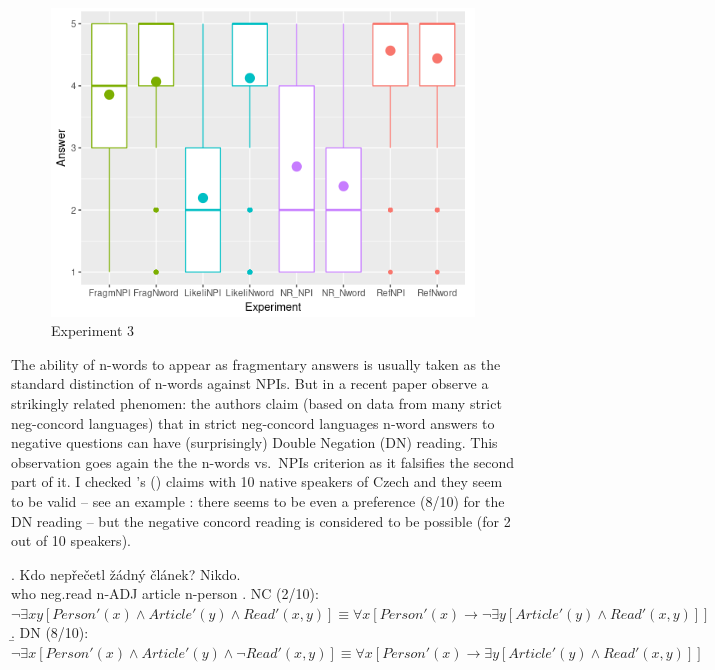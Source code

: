 \documentclass[12pt]{scrartcl}
\begin{document}
\begin{figure}
\centering
\includegraphics{include/Rplot04.png}
\caption{Experiment 3}\label{fig:exp3}
\end{figure}

The ability of n-words to appear as fragmentary answers is usually taken as the standard distinction of n-words against NPIs. But in a recent paper  \cite{fualuaus2016fragment} observe a strikingly related phenomen: the authors claim (based on data from many strict neg-concord languages) that in strict neg-concord languages n-word answers to negative questions can have (surprisingly) Double Negation (DN) reading. This observation goes again the the n-words vs.~NPIs criterion as it falsifies the second part of it. I checked \citeauthor{fualuaus2016fragment}'s (\citeyear{fualuaus2016fragment}) claims with 10 native speakers of Czech and they seem to be valid -- see an example \Next: there seems to be even a preference (8/10) for the DN reading -- \Next[a] but the negative concord reading \Next[b] is considered to be possible (for 2 out of 10 speakers). 

\ex. Kdo nepřečetl žádný článek? Nikdo.\\
who neg.read n-ADJ article n-person \a. NC (2/10):
\(\neg \exists xy[Person'(x) \wedge Article'(y) \wedge Read'(x,y)] \equiv \forall x[Person'(x) \rightarrow \neg \exists y[Article'(y) \wedge Read'(x,y)]]\)
\b. DN (8/10):
\(\neg \exists x[Person'(x) \wedge  Article'(y) \wedge \neg Read'(x,y)] \equiv\forall x[Person'(x) \rightarrow \exists y[Article'(y) \wedge Read'(x,y)]]\)
\end{document}
